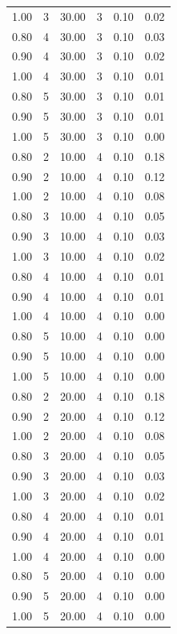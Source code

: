 \documentclass[12pt]{article}
\begin{document}
{\begin{longtable}{cccccc}
  1.00 &   3 & 30.00 &   3 & 0.10 & 0.02 \\ 
  0.80 &   4 & 30.00 &   3 & 0.10 & 0.03 \\ 
  0.90 &   4 & 30.00 &   3 & 0.10 & 0.02 \\ 
  1.00 &   4 & 30.00 &   3 & 0.10 & 0.01 \\ 
  0.80 &   5 & 30.00 &   3 & 0.10 & 0.01 \\ 
  0.90 &   5 & 30.00 &   3 & 0.10 & 0.01 \\ 
  1.00 &   5 & 30.00 &   3 & 0.10 & 0.00 \\ 
  0.80 &   2 & 10.00 &   4 & 0.10 & 0.18 \\ 
  0.90 &   2 & 10.00 &   4 & 0.10 & 0.12 \\ 
  1.00 &   2 & 10.00 &   4 & 0.10 & 0.08 \\ 
  0.80 &   3 & 10.00 &   4 & 0.10 & 0.05 \\ 
  0.90 &   3 & 10.00 &   4 & 0.10 & 0.03 \\ 
  1.00 &   3 & 10.00 &   4 & 0.10 & 0.02 \\ 
  0.80 &   4 & 10.00 &   4 & 0.10 & 0.01 \\ 
  0.90 &   4 & 10.00 &   4 & 0.10 & 0.01 \\ 
  1.00 &   4 & 10.00 &   4 & 0.10 & 0.00 \\ 
  0.80 &   5 & 10.00 &   4 & 0.10 & 0.00 \\ 
  0.90 &   5 & 10.00 &   4 & 0.10 & 0.00 \\ 
  1.00 &   5 & 10.00 &   4 & 0.10 & 0.00 \\ 
  0.80 &   2 & 20.00 &   4 & 0.10 & 0.18 \\ 
  0.90 &   2 & 20.00 &   4 & 0.10 & 0.12 \\ 
  1.00 &   2 & 20.00 &   4 & 0.10 & 0.08 \\ 
  0.80 &   3 & 20.00 &   4 & 0.10 & 0.05 \\ 
  0.90 &   3 & 20.00 &   4 & 0.10 & 0.03 \\ 
  1.00 &   3 & 20.00 &   4 & 0.10 & 0.02 \\ 
  0.80 &   4 & 20.00 &   4 & 0.10 & 0.01 \\ 
  0.90 &   4 & 20.00 &   4 & 0.10 & 0.01 \\ 
  1.00 &   4 & 20.00 &   4 & 0.10 & 0.00 \\ 
  0.80 &   5 & 20.00 &   4 & 0.10 & 0.00 \\ 
  0.90 &   5 & 20.00 &   4 & 0.10 & 0.00 \\ 
  1.00 &   5 & 20.00 &   4 & 0.10 & 0.00 \\ 

\end{longtable}}
\end{document}
